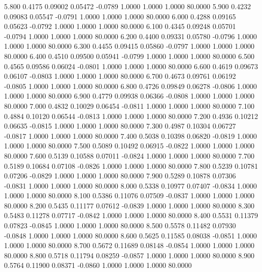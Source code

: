    5.800   0.4175   0.09002   0.05472  -0.0789   1.0000   1.0000   1.0000  80.0000
   5.900   0.4232   0.09083   0.05547  -0.0791   1.0000   1.0000   1.0000  80.0000
   6.000   0.4288   0.09165   0.05623  -0.0792   1.0000   1.0000   1.0000  80.0000
   6.100   0.4345   0.09248   0.05701  -0.0794   1.0000   1.0000   1.0000  80.0000
   6.200   0.4400   0.09331   0.05780  -0.0796   1.0000   1.0000   1.0000  80.0000
   6.300   0.4455   0.09415   0.05860  -0.0797   1.0000   1.0000   1.0000  80.0000
   6.400   0.4510   0.09500   0.05941  -0.0799   1.0000   1.0000   1.0000  80.0000
   6.500   0.4565   0.09586   0.06024  -0.0801   1.0000   1.0000   1.0000  80.0000
   6.600   0.4619   0.09673   0.06107  -0.0803   1.0000   1.0000   1.0000  80.0000
   6.700   0.4673   0.09761   0.06192  -0.0805   1.0000   1.0000   1.0000  80.0000
   6.800   0.4726   0.09849   0.06278  -0.0806   1.0000   1.0000   1.0000  80.0000
   6.900   0.4779   0.09938   0.06366  -0.0808   1.0000   1.0000   1.0000  80.0000
   7.000   0.4832   0.10029   0.06454  -0.0811   1.0000   1.0000   1.0000  80.0000
   7.100   0.4884   0.10120   0.06544  -0.0813   1.0000   1.0000   1.0000  80.0000
   7.200   0.4936   0.10212   0.06635  -0.0815   1.0000   1.0000   1.0000  80.0000
   7.300   0.4987   0.10304   0.06727  -0.0817   1.0000   1.0000   1.0000  80.0000
   7.400   0.5038   0.10398   0.06820  -0.0819   1.0000   1.0000   1.0000  80.0000
   7.500   0.5089   0.10492   0.06915  -0.0822   1.0000   1.0000   1.0000  80.0000
   7.600   0.5139   0.10588   0.07011  -0.0824   1.0000   1.0000   1.0000  80.0000
   7.700   0.5189   0.10684   0.07108  -0.0826   1.0000   1.0000   1.0000  80.0000
   7.800   0.5239   0.10781   0.07206  -0.0829   1.0000   1.0000   1.0000  80.0000
   7.900   0.5289   0.10878   0.07306  -0.0831   1.0000   1.0000   1.0000  80.0000
   8.000   0.5338   0.10977   0.07407  -0.0834   1.0000   1.0000   1.0000  80.0000
   8.100   0.5386   0.11076   0.07509  -0.0837   1.0000   1.0000   1.0000  80.0000
   8.200   0.5435   0.11177   0.07612  -0.0839   1.0000   1.0000   1.0000  80.0000
   8.300   0.5483   0.11278   0.07717  -0.0842   1.0000   1.0000   1.0000  80.0000
   8.400   0.5531   0.11379   0.07823  -0.0845   1.0000   1.0000   1.0000  80.0000
   8.500   0.5578   0.11482   0.07930  -0.0848   1.0000   1.0000   1.0000  80.0000
   8.600   0.5625   0.11585   0.08038  -0.0851   1.0000   1.0000   1.0000  80.0000
   8.700   0.5672   0.11689   0.08148  -0.0854   1.0000   1.0000   1.0000  80.0000
   8.800   0.5718   0.11794   0.08259  -0.0857   1.0000   1.0000   1.0000  80.0000
   8.900   0.5764   0.11900   0.08371  -0.0860   1.0000   1.0000   1.0000  80.0000
